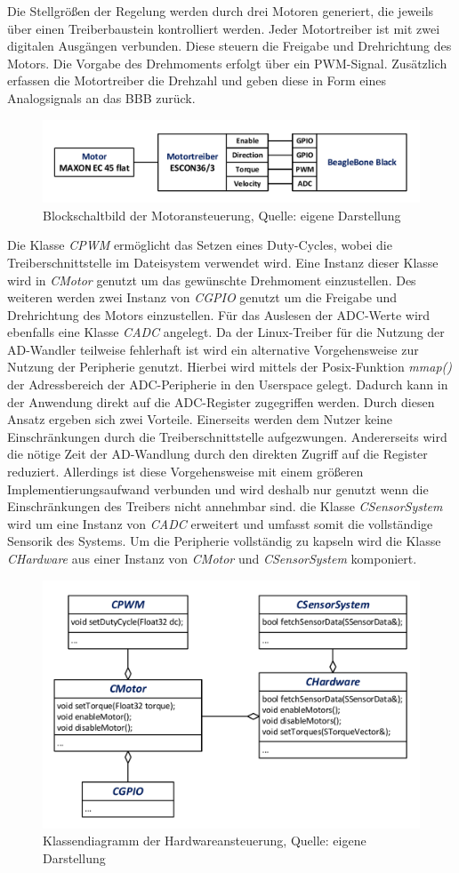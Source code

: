 Die Stellgrößen der Regelung werden durch drei Motoren generiert, die jeweils über einen Treiberbaustein kontrolliert werden. Jeder Motortreiber ist mit zwei digitalen Ausgängen verbunden. Diese steuern die Freigabe und Drehrichtung des Motors. Die Vorgabe des Drehmoments erfolgt über ein \ac{PWM}-Signal. Zusätzlich erfassen die Motortreiber die Drehzahl und geben diese in Form eines Analogsignals an das \ac{BBB} zurück.
\begin{figure}[!h]
\centering
\includegraphics[width=0.7\linewidth]{img/SW_0_Motoren_BSB.pdf}
\caption{Blockschaltbild der Motoransteuerung, Quelle: eigene Darstellung} 
\end{figure}
Die Klasse \textit{CPWM} ermöglicht das Setzen eines Duty-Cycles, wobei die Treiberschnittstelle im Dateisystem verwendet wird. Eine Instanz dieser Klasse wird in \textit{CMotor} genutzt um das gewünschte Drehmoment einzustellen. Des weiteren werden zwei Instanz von \textit{CGPIO} genutzt um die Freigabe und Drehrichtung des Motors einzustellen. Für das Auslesen der \ac{ADC}-Werte wird ebenfalls eine Klasse \textit{C\ac{ADC}} angelegt. Da der Linux-Treiber für die Nutzung der AD-Wandler teilweise fehlerhaft ist wird ein alternative Vorgehensweise zur Nutzung der Peripherie genutzt. Hierbei wird mittels der Posix-Funktion \textit{mmap()} der Adressbereich der \ac{ADC}-Peripherie in den Userspace gelegt. Dadurch kann in der Anwendung direkt auf die \ac{ADC}-Register zugegriffen werden. Durch diesen Ansatz ergeben sich zwei Vorteile. Einerseits werden dem Nutzer keine Einschränkungen durch die Treiberschnittstelle aufgezwungen. Andererseits wird die nötige Zeit der AD-Wandlung durch den direkten Zugriff auf die Register reduziert. Allerdings ist diese Vorgehensweise mit einem größeren Implementierungsaufwand verbunden und wird deshalb nur genutzt wenn die Einschränkungen des Treibers nicht annehmbar sind.
die Klasse \textit{CSensorSystem} wird um eine Instanz von \textit{CADC} erweitert und umfasst somit die vollständige Sensorik des Systems. Um die Peripherie vollständig zu kapseln wird die Klasse \textit{CHardware} aus einer Instanz von \textit{CMotor} und \textit{CSensorSystem} komponiert.
\begin{figure}[!h]
\centering
\includegraphics[width=0.7\linewidth]{img/SW_0_Hardware_KD.pdf}
\caption{Klassendiagramm der Hardwareansteuerung, Quelle: eigene Darstellung}
\end{figure}